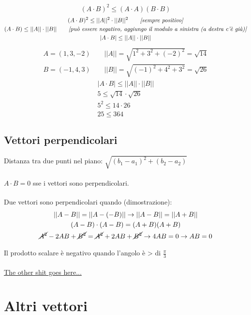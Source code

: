 \documentclass[italian]{article}
\begin{document}
\[(A\cdot B)^2 \leq (A\cdot A)(B\cdot B)\]
\begin{gather*}
	(A\cdot B)^2 \leq ||A||^2 \cdot ||B||^2 \qquad \emph{[sempre positivo]} \\
	(A\cdot B) \leq ||A|| \cdot ||B|| \qquad \emph{[può essere negativo, aggiungo il modulo a sinistra (a destra c'è già)]} \\
	|A\cdot B| \leq ||A|| \cdot ||B|| \\
\end{gather*}
\begin{gather*}
	A=(1,3,-2) \qquad ||A||=\sqrt{1^2+3^2+(-2)^2}=\sqrt{14} \\
	B=(-1,4,3) \qquad ||B|| = \sqrt{(-1)^2+4^2+3^2}=\sqrt{26}
\end{gather*}
\begin{gather*}
	|A\cdot B| \leq ||A||\cdot||B|| \\
	5 \leq \sqrt{14} \cdot \sqrt{26} \\
	5^2 \leq 14\cdot 26 \\
	25 \leq 364
\end{gather*}


\pagebreak
\subsection{Vettori perpendicolari}
Distanza tra due punti nel piano: $\sqrt{(b_1-a_1)^2+(b_2-a_2)}$\\\\
$A\cdot B = 0$ sse i vettori sono perpendicolari.\\\\
Due vettori sono perpendicolari quando (dimostrazione):
\begin{gather*}
	||A-B||=||A-(-B)||\rightarrow||A-B||=||A+B|| \\
	(A-B)\cdot (A-B)=(A+B)(A+B) \\
	\cancel{A^2}-2AB+\cancel{B^2} = \cancel{A^2}+2AB+\cancel{B^2} \rightarrow 4AB=0 \to AB=0
\end{gather*}




Il prodotto scalare è negativo quando l'angolo è > di $\frac{\pi}{3}$\\\\
\underline{The other shit goes here...}

\pagebreak
\section{Altri vettori}
\end{document}
